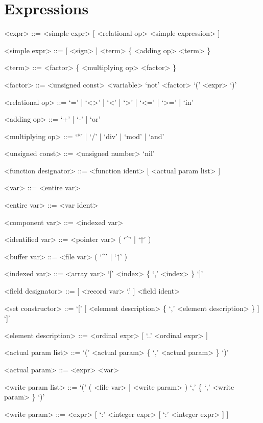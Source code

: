 \documentclass{article}
\begin{document}
\section{Expressions}

{
  \begin{grammar}
    <expr> ::= <simple expr> [ <relational op> <simple expression> ]

    <simple expr> ::= [ <sign> ] <term> \{ <adding op> <term> \}

    <term> ::= <factor> \{ <multiplying op> <factor> \}

    <factor> ::= <unsigned const>  \alt <variable>   \alt `not' <factor> \alt `(' <expr> `)'

    <relational op> ::= `=' | `<>' | `<' | `>' | `<=' | `>=' | `in'

    <adding op> ::= `+' | `-' | `or'

    <multiplying op> ::= `*' | `/' | `div' | `mod' | `and'

    <unsigned const> ::= <unsigned number>   \alt `nil'

    <function designator> ::= <function ident> [ <actual param list> ]

    <var> ::= <entire var>   

    <entire var> ::= <var ident>

    <component var> ::= <indexed var> 

    <identified var> ::= <pointer var> ( `^' | `↑' )

    <buffer var> ::= <file var> ( `^' | `↑' )

    <indexed var> ::= <array var> `[' <index> \{ `,' <index> \} `]'

    <field designator> ::= [ <record var> `.' ] <field ident>

    <set constructor> ::= `[' [ <element description> \{ `,' <element description> \} ] `]'

    <element description> ::= <ordinal expr> [ `..' <ordinal expr> ]

    <actual param list> ::= `(' <actual param> \{ `,' <actual param> \} `)'

    <actual param> ::= <expr> \alt <var>  

    <write param list> ::= `(' ( <file var> | <write param> ) `,' \{  `,' <write param> \} `)'

    <write param> ::= <expr> [ `:' <integer expr> [ `:' <integer expr> ] ]
  \end{grammar}
}
\end{document}
